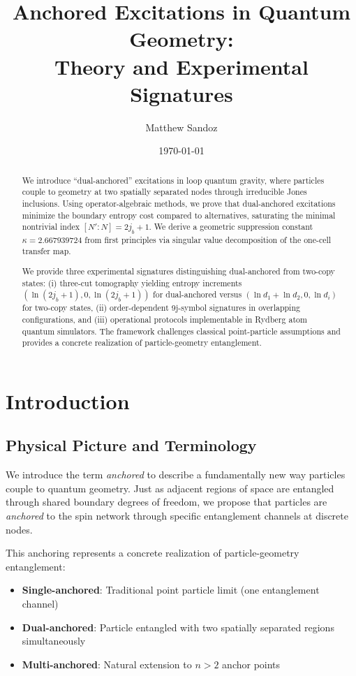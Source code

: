 \documentclass[11pt]{article}
\title{Anchored Excitations in Quantum Geometry: \\ Theory and Experimental Signatures}
\author{Matthew Sandoz}
\date{\today}
\theoremstyle{plain}
\theoremstyle{definition}
\begin{document}
\pagestyle{plain}
\maketitle

\begin{abstract}
  We introduce ``dual-anchored'' excitations in loop quantum gravity, where particles couple to geometry at two spatially separated nodes through irreducible Jones inclusions. Using operator-algebraic methods, we prove that dual-anchored excitations minimize the boundary entropy cost compared to alternatives, saturating the minimal nontrivial index $[N':N] = 2j_b+1$. We derive a geometric suppression constant $\kappa = 2.667939724$ from first principles via singular value decomposition of the one-cell transfer map.

  We provide three experimental signatures distinguishing dual-anchored from two-copy states: (i) three-cut tomography yielding entropy increments $(\ln(2j_b+1), 0, \ln(2j_b+1))$ for dual-anchored versus $(\ln d_1 + \ln d_2, 0, \ln d_i)$ for two-copy states, (ii) order-dependent 9j-symbol signatures in overlapping configurations, and (iii) operational protocols implementable in Rydberg atom quantum simulators. The framework challenges classical point-particle assumptions and provides a concrete realization of particle-geometry entanglement.
\end{abstract}

\section{Introduction}
\label{sec:intro}

\subsection{Physical Picture and Terminology}

We introduce the term \emph{anchored} to describe a fundamentally new way particles couple to quantum geometry. Just as adjacent regions of space are entangled through shared boundary degrees of freedom, we propose that particles are \emph{anchored} to the spin network through specific entanglement channels at discrete nodes.

This anchoring represents a concrete realization of particle-geometry entanglement:
\begin{itemize}
  \item \textbf{Single-anchored}: Traditional point particle limit (one entanglement channel)
  \item \textbf{Dual-anchored}: Particle entangled with two spatially separated regions simultaneously
  \item \textbf{Multi-anchored}: Natural extension to $n > 2$ anchor points
\end{itemize}
\end{document}
